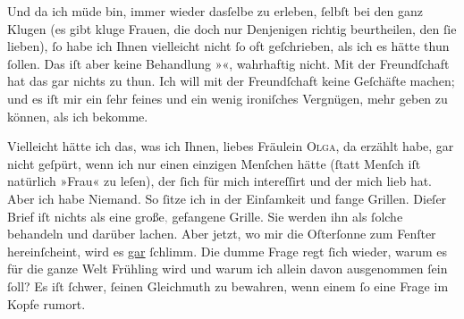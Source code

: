 \pstart
           Und da ich müde bin, immer wieder dasſelbe zu erleben,{ }ſelbſt bei den ganz Klugen (es
               gibt kluge Frauen, die doch {\pb}nur Denjenigen richtig
               beurtheilen, den{ }ſie lieben),{ }ſo habe ich Ihnen vielleicht nicht{ }ſo oft geſchrieben,
               als ich es hätte thun{ }ſollen. Das iſt aber keine Behandlung »\label{K_L03524-1v}\label{K_L03524-1}«,
               wahrhaftig nicht. Mit der Freundſchaft hat das gar nichts zu thun. Ich will mit der
               Freundſchaft keine Geſchäfte machen; und es iſt mir ein{ }ſehr feines und ein wenig
               ironiſches Vergnügen, mehr geben zu können, als ich bekomme.\pend
           
\pstart
           Vielleicht hätte ich das, was ich Ihnen, liebes Fräulein \textsc{Olga}, da erzählt habe, gar nicht geſpürt, wenn ich \strikeout{\textcolor{gray}{×}} nur einen einzigen Menſchen hätte (ſtatt Menſch iſt natürlich »Frau« zu
               leſen), der{ }ſich für mich intereſſirt und der mich lieb hat. Aber ich habe {\pb}Niemand. So{ }ſitze ich in der Einſamkeit und fange
               Grillen. Dieſer Brief iſt nichts als eine große\textcolor{gray}{,} gefangene Grille.
               Sie werden ihn als{ }ſolche behandeln und darüber lachen. Aber jetzt, wo mir die Oſterſonne zum Fenſter hereinſcheint, wird es \uline{gar}{ }ſchlimm. Die dumme Frage regt{ }ſich wieder, warum
               es für die ganze Welt Frühling wird und warum ich allein davon ausgenommen{ }ſein{ }ſoll?
               Es iſt{ }ſchwer,{ }ſeinen Gleichmuth zu bewahren, wenn einem{ }ſo eine Frage im Kopfe
               rumort.\pend
           
